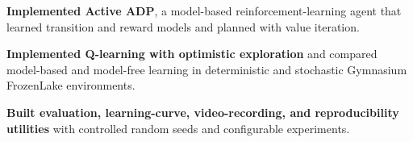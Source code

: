 \begin{bullets}
    \item \textbf{Implemented Active ADP}, a model-based reinforcement-learning agent that learned transition and reward models and planned with value iteration.
    \item \textbf{Implemented Q-learning with optimistic exploration} and compared model-based and model-free learning in deterministic and stochastic Gymnasium FrozenLake environments.
    \item \textbf{Built evaluation, learning-curve, video-recording, and reproducibility utilities} with controlled random seeds and configurable experiments.
\end{bullets}